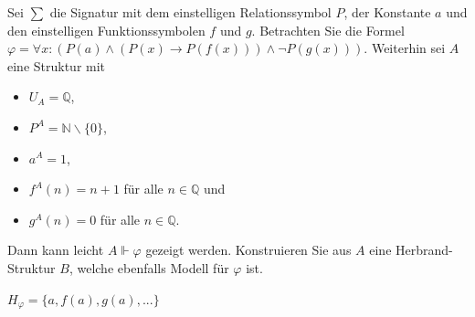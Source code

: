 \documentclass[10pt, a4paper]{exam}
\begin{document}
\begin{questions}

    \question Sei $\sum$ die Signatur mit dem einstelligen Relationssymbol $P$, der Konstante $a$ und den einstelligen Funktionssymbolen $f$ und $g$. Betrachten Sie die Formel $\varphi=\forall x:(P(a)\wedge(P(x)\rightarrow P(f(x)))\wedge\lnot P(g(x)))$. Weiterhin sei $A$ eine Struktur mit
    \begin{itemize}
        \item $U_A=\mathbb{Q}$,
        \item $P^A=\mathbb{N}\backslash\{0\}$,
        \item $a^A=1$,
        \item $f^A(n)=n+1$ für alle $n\in\mathbb{Q}$ und
        \item $g^A(n)=0$ für alle $n\in\mathbb{Q}$.
    \end{itemize}
    Dann kann leicht $A\Vdash\varphi$ gezeigt werden. Konstruieren Sie aus $A$ eine Herbrand-Struktur $B$, welche ebenfalls Modell für $\varphi$ ist.
    \begin{solution}

        $H_{\varphi} = \{a, f(a), g(a), ... \}$

    \end{solution}

\end{questions}
\end{document}
